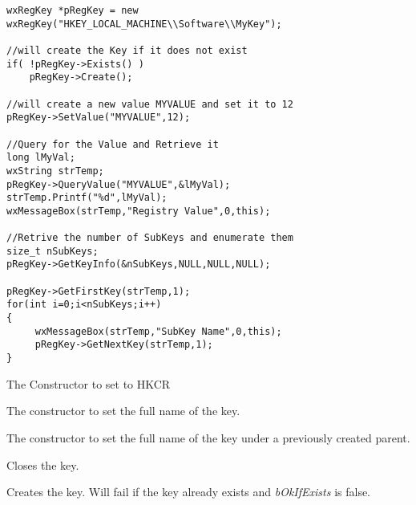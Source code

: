 \begin{verbatim}
wxRegKey *pRegKey = new wxRegKey("HKEY_LOCAL_MACHINE\\Software\\MyKey");

//will create the Key if it does not exist
if( !pRegKey->Exists() )
    pRegKey->Create();

//will create a new value MYVALUE and set it to 12
pRegKey->SetValue("MYVALUE",12);

//Query for the Value and Retrieve it
long lMyVal;
wxString strTemp;
pRegKey->QueryValue("MYVALUE",&lMyVal); 
strTemp.Printf("%d",lMyVal);
wxMessageBox(strTemp,"Registry Value",0,this);

//Retrive the number of SubKeys and enumerate them
size_t nSubKeys;
pRegKey->GetKeyInfo(&nSubKeys,NULL,NULL,NULL);

pRegKey->GetFirstKey(strTemp,1);
for(int i=0;i<nSubKeys;i++)
{
     wxMessageBox(strTemp,"SubKey Name",0,this);
     pRegKey->GetNextKey(strTemp,1);
}
\end{verbatim}



\label{wxregkeyctor}


The Constructor to set to HKCR


The constructor to set the full name of the key.


The constructor to set the full name of the key under a previously created parent.


\label{wxregkeyclose}


Closes the key.


\label{wxregkeycreate}


Creates the key. Will fail if the key already exists and {\it bOkIfExists} is false.


\label{wxregkeydeleteself}



